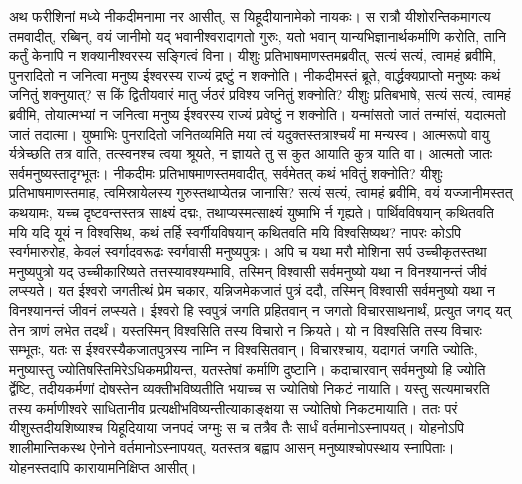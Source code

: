 \adhyAya
{}
\vakya अथ फरीशिनां मध्ये नीकदीमनामा नर आसीत्, स यिहूदीयानामेको नायकः।
\vakya स रात्रौ यीशोरन्तिकमागत्य तमवादीत्, रब्बिन्, वयं जानीमो यद् भवानीश्वरादागतो गुरुः, यतो भवान् यान्यभिज्ञानार्थकर्माणि करोति, तानि कर्तुं केनापि न शक्यानीश्वरस्य सङ्गित्वं विना।
\vakya यीशुः प्रतिभाषमाणस्तमब्रवीत्, सत्यं सत्यं, त्वामहं ब्रवीमि, पुनरादितो न जनित्वा मनुष्य ईश्वरस्य राज्यं द्रष्टुं न शक्नोति।
\vakya नीकदीमस्तं ब्रूते, वार्द्धक्यप्राप्तो मनुष्यः कथं जनितुं शक्नुयात्? स किं द्वितीयवारं मातु र्जठरं प्रविश्य जनितुं शक्नोति?
\vakya यीशुः प्रतिबभाषे, सत्यं सत्यं, त्वामहं ब्रवीमि, तोयात्मभ्यां न जनित्वा मनुष्य ईश्वरस्य राज्यं प्रवेष्टुं न शक्नोति।
\vakya यन्मांसतो जातं तन्मांसं, यदात्मतो जातं तदात्मा।
\vakya युष्माभिः पुनरादितो जनितव्यमिति मया त्वं यदुक्तस्तत्राश्चर्यं मा मन्यस्व।
\vakya आत्मरूपो वायु र्यत्रेच्छति तत्र वाति, तत्स्वनश्च त्वया श्रूयते, न ज्ञायते तु स कुत आयाति कुत्र याति वा। आत्मतो जातः सर्वमनुष्यस्तादृग्भूतः।
\vakya नीकदीमः प्रतिभाषमाणस्तमवादीत्, सर्वमेतत् कथं भवितुं शक्नोति?
\vakya यीशुः प्रतिभाषमाणस्तमाह, त्वमिस्रायेलस्य गुरुस्तथाप्येतन्न जानासि?
\vakya सत्यं सत्यं, त्वामहं ब्रवीमि, वयं यज्जानीमस्तत् कथयामः, यच्च दृष्टवन्तस्तत्र साक्ष्यं दद्मः, तथाप्यस्मत्साक्ष्यं युष्माभि र्न गृह्यते।
\vakya पार्थिवविषयान् कथितवति मयि यदि यूयं न विश्वसिथ, कथं तर्हि स्वर्गीयविषयान् कथितवति मयि विश्वसिष्यथ?
\vakya नापरः कोऽपि स्वर्गमारुरोह, केवलं स्वर्गादवरूढः स्वर्गवासी मनुष्यपुत्रः।
\vakya अपि च यथा मरौ मोशिना सर्प उच्चीकृतस्तथा मनुष्यपुत्रो यद् उच्चीकारिष्यते तत्तस्यावश्यम्भावि,
\vakya तस्मिन् विश्वासी सर्वमनुष्यो यथा न विनश्यानन्तं जीवं लप्स्यते।
\vakya यत ईश्वरो जगतीत्थं प्रेम चकार, यन्निजमेकजातं पुत्रं ददौ, तस्मिन् विश्वासी सर्वमनुष्यो यथा न विनश्यानन्तं जीवनं लप्स्यते।
\vakya ईश्वरो हि स्वपुत्रं जगति प्रहितवान् न जगतो विचारसाथनार्थं, प्रत्युत जगद् यत् तेन त्राणं लभेत तदर्थं।
\vakya यस्तस्मिन् विश्वसिति तस्य विचारो न क्रियते। यो न विश्वसिति तस्य विचारः सम्भूतः, यतः स ईश्वरस्यैकजातपुत्रस्य नाम्नि न विश्वसितवान्।
\vakya विचारश्चाय, यदागतं जगति ज्योतिः, मनुष्यास्तु ज्योतिषस्तिमिरेऽधिकमप्रीयन्त, यतस्तेषां कर्माणि दुष्टानि।
\vakya कदाचारवान् सर्वमनुष्यो हि ज्योति र्द्वेष्टि, तदीयकर्मणां दोषस्तेन व्यक्तीभविष्यतीति भयाच्च स ज्योतिषो निकटं नायाति।
\vakya यस्तु सत्यमाचरति तस्य कर्माणीश्वरे साधितानीव प्रत्यक्षीभविष्यन्तीत्याकाङ्क्षया स ज्योतिषो निकटमायाति।
\vakya ततः परं यीशुस्तदीयशिष्याश्च यिहूदियाया जनपदं जग्मुः स च तत्रैव तैः सार्धं वर्तमानोऽस्नापयत्।
\vakya योहनोऽपि शालीमान्तिकस्थ ऐनोने वर्तमानोऽस्नापयत्, यतस्तत्र बह्वाप आसन् मनुष्याश्चोपस्थाय स्नापिताः।
\vakya योहनस्तदापि कारायामनिक्षिप्त आसीत्।
